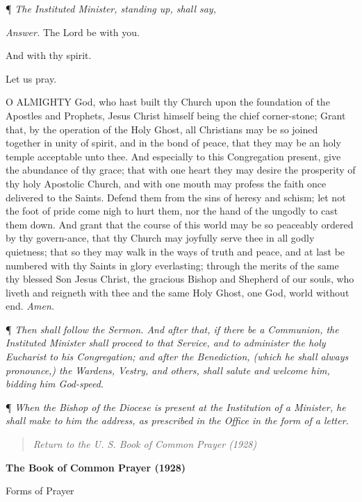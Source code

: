 ¶ \emph{The Instituted Minister, standing
up, shall say,}

\emph{Answer.} The Lord be with
you.

And with thy spirit.

Let us pray.

O ALMIGHTY God, who hast
built thy Church upon the foundation of the Apostles and Prophets, Jesus
Christ himself being the chief corner-stone; Grant that, by the operation
of the Holy Ghost, all Christians may be so joined together in unity of
spirit, and in the bond of peace, that they may be an holy temple acceptable
unto thee. And especially to this Congregation present, give the abundance
of thy grace; that with one heart they may desire the prosperity of thy
holy Apostolic Church, and with one mouth may profess the faith once delivered
to the Saints. Defend them from the sins of heresy and schism; let not
the foot of pride come nigh to hurt them, nor the hand of the ungodly
to cast them down. And grant that the course of this world may be so peaceably
ordered by thy govern-ance, that thy Church may joyfully serve thee in
all godly quietness; that so they may walk in the ways of truth and peace,
and at last be numbered with thy Saints in glory everlasting; through
the merits of the same thy blessed Son Jesus Christ, the gracious Bishop
and Shepherd of our souls, who liveth and reigneth with thee and the same
Holy Ghost, one God, world without end. \emph{Amen.}

¶ \emph{Then shall follow
the Sermon. And after that, if there be a Communion, the Instituted Minister
shall proceed to that Service, and to administer the holy Eucharist to
his Congregation; and after the Benediction, (which he shall always pronounce,)
the Wardens, Vestry, and others, shall salute and welcome him, bidding
him God-speed.}

¶ \emph{When the Bishop
of the Diocese is present at the Institution of a Minister, he shall make
to him the address, as prescribed in the Office in the form of a letter.}

\begin{quote}

\emph{Return to the U.
S. Book of Common Prayer (1928)}

\end{quote}


\textbf{The Book of Common Prayer (1928)}

Forms
of Prayer

